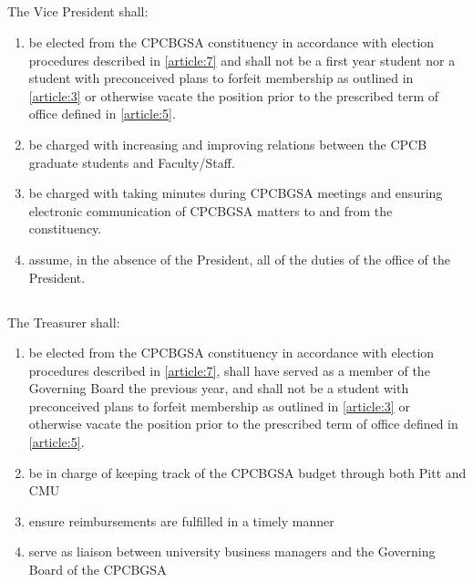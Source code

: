 \documentclass[11pt,a4paper]{article}
\begin{document}
\subsection{} The Vice President shall:
\begin{enumerate}        
	\item be elected from the CPCBGSA constituency in accordance with election procedures described in \cref{article:7} and shall not be a first year student nor a student with preconceived plans to forfeit membership as outlined in \cref{article:3} or otherwise vacate the position prior to the prescribed term of office defined in \cref{article:5}.
	\item be charged with increasing and improving relations between the CPCB graduate students and Faculty/Staff.
	\item be charged with taking minutes during CPCBGSA meetings and ensuring electronic communication of CPCBGSA matters to and from the constituency.
	\item assume, in the absence of the President, all of the duties of the office of the President.
\end{enumerate}        
 
\subsection{} The Treasurer shall:
\begin{enumerate}        
	\item be elected from the CPCBGSA constituency in accordance with election procedures described in \cref{article:7}, shall have served as a member of the Governing Board the previous year, and shall not be a student with preconceived plans to forfeit membership as outlined in \cref{article:3} or otherwise vacate the position prior to the prescribed term of office defined in \cref{article:5}.
	\item be in charge of keeping track of the CPCBGSA budget through both Pitt and CMU
	\item ensure reimbursements are fulfilled in a timely manner
	\item serve as liaison between university business managers and the Governing Board of the CPCBGSA
\end{enumerate}    
\end{document}
